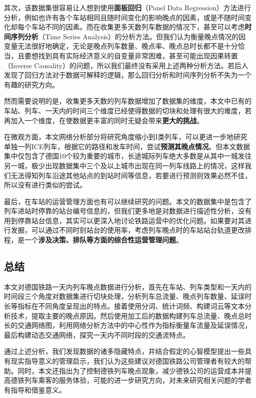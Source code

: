 \documentclass[lang=cn,12pt,a4paper,cite=authoryear]{elegantpaper}
\begin{document}
其次，该数据集很容易让人想到使用\textbf{面板回归}（Panel Data Regression）方法进行分析，例如也许有各个车站相同且随时间变化的影响晚点的因素，或是不随时间变化却每个车站不同的因素。而在收集更多天数列车数据的情况下，甚至可以考虑\textbf{时间序列分析}（Time Series Analysis）的分析方法。但我们认为衡量晚点情况的因变量无法很好地确定，无论是晚点列车数量、晚点率、晚点总时长都不是十分恰当，且要想找到具有实际经济意义的自变量非常困难，甚至可能出现因果转置（Inverse Causality）的问题，所以我们最终没有采用上述两种分析方法。若后人发现了回归方法对于数据可解释的逻辑，那么回归分析和时间序列分析不失为一个有趣的研究方向。

然而需要说明的是，收集更多天数的列车数据增加了数据集的维度，本文中已有的车站、列车、一天内的时间三个维度已经使得数据的切块和处理有很大的难度，若再加入一个维度，在使数据更丰富的同时无疑会带来\textbf{更大的挑战}。

在微观方面，本文网络分析部分将研究角度缩小到I类列车，可以更进一步地研究单独一列ICE列车，根据它的路径和发车时间，尝试\textbf{预测其晚点情况}。但本文数据集中仅包含了德国10个较为重要的城市，长途城际列车绝大多数是从其中一城发往另一城，极少出现数据集中三个及以上城市出现在同一列车线路上的情况，这样我们无法得知列车沿途其他站点的到站时间等信息，若要进行预测则效果必然不佳，所以没有进行类似的尝试。

最后，在车站的运营管理方面也有可以继续研究的问题。本文的数据集中是包含了列车进站时停靠的站台编号信息的，但我们更多地是对数据进行描述性分析，没有用到停靠站台信息，其实可以更深入地讨论铁路运营中的优化问题。如果要对其进行发掘，可以通过不同时刻站台的使用率，考虑列车晚点时的车站站台轨道更改排程，是一个\textbf{涉及决策、排队等方面的综合性运营管理问题}。

\subsection{总结}

本文对德国铁路一天内列车晚点数据进行分析，首先在车站、列车类型和一天内的时间段三个角度对数据集进行切块处理，分析列车总流量、晚点列车数量、延误时长等指标在不同角度呈现出的特点。接着使用分词、统计词频、构建词云等文本分析技术，提取主要的晚点原因。然后使用加工后的数据构建列车总流量、晚点总时长的交通网络图，利用网络分析方法中的中心性作为指标衡量车流量及延误情况，最后构建动态交通网络，探究一天内不同时段的交通流特点。

通过上述分析，我们发现数据的诸多隐藏特点，并结合假定的心智模型提出一些具有现实指导意义的管理启示，我们认为这些建议对德国铁路公司管理者有较大的帮助。同时，本文还指出为了控制德铁列车晚点现象，减少德铁公司的运营成本并提高德铁列车乘客的服务体验，可能的进一步研究方向，对未来研究相关问题的学者有指导和借鉴意义。
\end{document}
